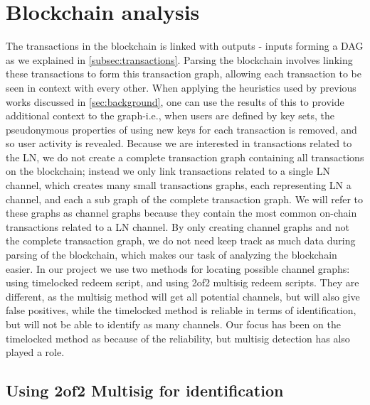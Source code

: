 \section{Blockchain analysis}
\label{blockchain_analysis}
The transactions in the blockchain is linked with outputs - inputs forming a DAG as we explained in \cref{subsec:transactions}. Parsing the blockchain involves linking these transactions to form this transaction graph, allowing each transaction to be seen in context with every other. When applying the heuristics used by previous works discussed in \cref{sec:background}, one can use the results of this to provide additional context to the graph-i.e., when users are defined by key sets, the pseudonymous properties of using new keys for each transaction is removed, and so user activity is revealed. Because we are interested in transactions related to the LN, we do not create a complete transaction graph containing all transactions on the blockchain; instead we only link transactions related to a single LN channel, which creates many small transactions graphs, each representing LN a channel, and each a sub graph of the complete transaction graph. 
We will refer to these graphs as channel graphs because they contain the most common on-chain transactions related to a LN channel.
By only creating channel graphs and not the complete transaction graph, we do not need keep track as much data during parsing of the blockchain, which makes our task of analyzing the blockchain easier. 
In our project we use two methods for locating possible channel graphs: using timelocked redeem script, and using 2of2 multisig redeem scripts.
They are different, as the multisig method will get all potential channels, but will also give false positives, while the timelocked method is reliable in terms of identification, but will not be able to identify as many channels.
Our focus has been on the timelocked method as because of the reliability, but multisig detection has also played a role.


\subsection{Using 2of2 Multisig for identification}
\label{detection_ms}


